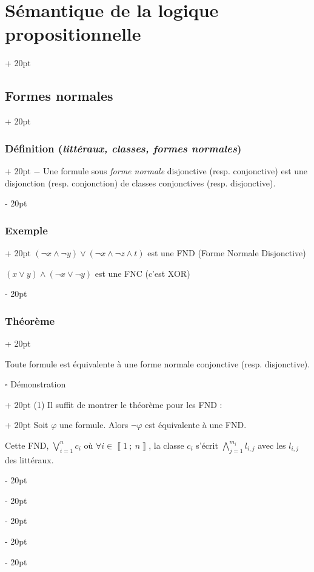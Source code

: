 \documentclass[a4paper, 12pt, twoside]{article}
\newcommand{\nset}[2]{\left\llbracket #1\ ;\ #2 \right\rrbracket}
\newcommand{\ind}[1][20pt]{\advance\leftskip + #1}
\newcommand{\deind}[1][20pt]{\advance\leftskip - #1}
\newenvironment{indt}[2][20pt]{#2 \par \ind[#1]}{\par \deind} %
\begin{document}
\begin{indt}{\section{Sémantique de la logique propositionnelle}}
\begin{indt}{\subsection{Formes normales}}
\begin{indt}{\subsubsection{Définition (\textit{littéraux, classes, formes normales})}}
                $-$ Une formule sous \textit{forme normale} disjonctive (resp. conjonctive) est une disjonction (resp. conjonction) de classes conjonctives (resp. disjonctive).
            \end{indt}
            
            \vspace{12pt}
            
            \begin{indt}{\subsubsection{Exemple}}
                $(\neg x \wedge \neg y) \vee (\neg x \wedge \neg z \wedge t)$ est une FND (Forme Normale Disjonctive)
                
                $(x \vee y) \wedge (\neg x \vee \neg y)$ est une FNC (c'est XOR)
            \end{indt}
            
            \vspace{12pt}
            
            \begin{indt}{\subsubsection{Théorème}}
                \begin{pseudocode}
                    Toute formule est équivalente à une forme normale conjonctive (resp. disjonctive).
                \end{pseudocode}
                
                \vspace{6pt}
                
                \begin{indt}{$\square$ Démonstration}
                    \begin{indt}{(1) Il suffit de montrer le théorème pour les FND :}
                        Soit $\varphi$ une formule. Alors $\neg \varphi$ est équivalente à une FND.
                        
                        Cette FND, $\displaystyle \bigvee_{i = 1}^n c_i$ où $\forall i \in \nset 1 n$, la classe $c_i$ s'écrit $\displaystyle \bigwedge_{j = 1}^{m_i} l_{i, j}$ avec les $l_{i, j}$ des littéraux.
                        

\end{indt}
\end{indt}
\end{indt}
\end{indt}
\end{indt}
\end{document}
